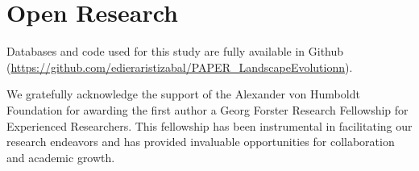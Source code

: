 \documentclass[draft]{agujournal2019}
\begin{document}
\section{Open Research}
Databases and code used for this study are fully available in Github (\url{https://github.com/edieraristizabal/PAPER_LandscapeEvolutionn}).

\acknowledgments
We gratefully acknowledge the support of the Alexander von Humboldt Foundation for awarding the first author a Georg Forster Research Fellowship for Experienced Researchers. This fellowship has been instrumental in facilitating our research endeavors and has provided invaluable opportunities for collaboration and academic growth.


\end{document}
